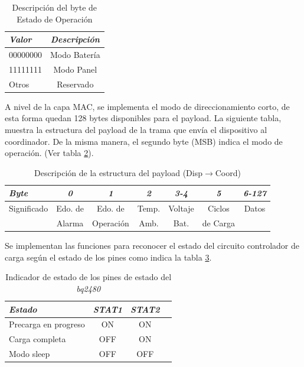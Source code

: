{\begin{table}[ht]
	\centering
	\caption{Descripción del byte de Estado de Operación}
	\begin{tabular}{@{} l *1c @{}}    \toprule
		\emph{\textbf{Valor}} & \emph{\textbf{Descripción}}\\
		\midrule
		00000000 &  Modo Batería\\
		11111111 &  Modo Panel\\
		Otros & Reservado\\
		\bottomrule
		\hline
	\end{tabular}
	\label{tab:edoope}
\end{table}

A nivel de la capa MAC, se implementa el modo de direccionamiento corto, de esta forma quedan 128 bytes disponibles para el payload. La siguiente tabla, muestra la estructura del payload de la trama que envía el dispositivo al coordinador. De la misma manera, el segundo byte (MSB) indica el modo de operación. (Ver tabla \ref{tab:dispcoor}).

\begin{table}[ht]
	\centering
	\caption{Descripción de la estructura del payload (Disp$\rightarrow$Coord)}
	\begin{tabular}{@{} l *6c @{}}    \toprule
		\emph{\textbf{Byte}} & \emph{\textbf{0}} & \emph{\textbf{1}} & \emph{\textbf{2}} & \emph{\textbf{3-4}} & \emph{\textbf{5}} & \emph{\textbf{6-127}}\\
		\midrule
		Significado & Edo. de & Edo. de & Temp. & Voltaje & Ciclos & Datos\\
		 & Alarma & Operación & Amb. & Bat. & de Carga & \\
		\bottomrule
		\hline
	\end{tabular}
	\label{tab:dispcoor}
\end{table}

Se implementan las funciones para reconocer el estado del circuito controlador de carga según el estado de los pines como indica la tabla \ref{tab:STAT}.

\begin{table}[ht]
	\centering
	\caption{Indicador de estado de los pines de estado del \textit{bq2480}}
	\begin{tabular}{@{} l *3c @{}}    \toprule
		\emph{\textbf{Estado}} & \emph{\textbf{STAT1}} & \emph{\textbf{STAT2}}\\
		\midrule
		Precarga en progreso &  ON & ON \\	
		Carga completa &  OFF & ON \\
		Modo sleep &  OFF & OFF \\
		\bottomrule
		\hline
	\end{tabular}
	\label{tab:STAT}
\end{table}

}
